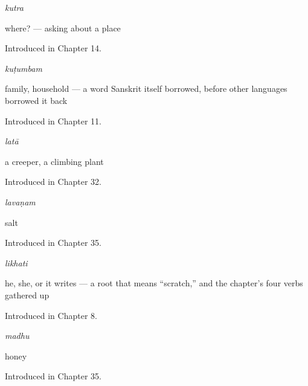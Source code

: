 \noindent\begin{minipage}[t]{\linewidth}
\raggedright
\textbf{}\enspace\emph{kutra}\par
\small where? — asking about a place\par
\footnotesize Introduced in Chapter 14.
\end{minipage}\par\medskip

\noindent\begin{minipage}[t]{\linewidth}
\raggedright
\textbf{}\enspace\emph{kuṭumbam}\par
\small family, household — a word Sanskrit itself borrowed, before other languages borrowed it back\par
\footnotesize Introduced in Chapter 11.
\end{minipage}\par\medskip

\noindent\begin{minipage}[t]{\linewidth}
\raggedright
\textbf{}\enspace\emph{latā}\par
\small a creeper, a climbing plant\par
\footnotesize Introduced in Chapter 32.
\end{minipage}\par\medskip

\noindent\begin{minipage}[t]{\linewidth}
\raggedright
\textbf{}\enspace\emph{lavaṇam}\par
\small salt\par
\footnotesize Introduced in Chapter 35.
\end{minipage}\par\medskip

\noindent\begin{minipage}[t]{\linewidth}
\raggedright
\textbf{}\enspace\emph{likhati}\par
\small he, she, or it writes — a root that means \textquotedblleft{}scratch,\textquotedblright{} and the chapter's four verbs gathered up\par
\footnotesize Introduced in Chapter 8.
\end{minipage}\par\medskip

\noindent\begin{minipage}[t]{\linewidth}
\raggedright
\textbf{}\enspace\emph{madhu}\par
\small honey\par
\footnotesize Introduced in Chapter 35.
\end{minipage}\par\medskip

